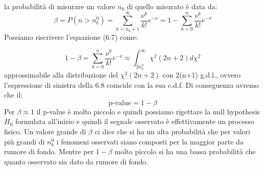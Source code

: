 \noindent la probabilit\`{a} di misurare un valore $n_b$ di quello misurato \`{e} data da:
\begin{equation}
	\beta = P(n > n_b^{0}) = \sum_{k =n_0+1}^{\infty}\dfrac{\nu^k}{k!}e^{-\nu} = 1- \sum_{k =0}^{n}\dfrac{\nu^k}{k!}e^{-\nu}  	
\end{equation}
Possiamo riscrivere l'equazione (6.7) come:

\begin{equation}
	1-\beta = \sum_{k =0}^{n}\dfrac{\nu^k}{k!}e^{-\nu} \approx \int_{2n_{b}^0}^{\infty}\chi^2(2n+2)d\chi^2
\end{equation} 
\newline
approssimabile alla distribuzione del $\chi^2(2n+2)$ con 2(n+1) g.d.l., ovvero l'espressione di sinistra della 6.8 coincide con la sua c.d.f. Di conseguenza avremo che il:
\begin{equation*}
	\text{p-value} = 1- \beta
\end{equation*}
Per $\beta \approx 1$ il p-value \`{e} molto piccolo e quindi possiamo rigettare la null hypothesis $H_0$ formulata all'inizio e quindi il segnale osservato \`{e} effettivamente un processo fisico. Un valore grande di $\beta$ ci dice che si ha un alta probabilit\`{a} che per valori pi\`{u} grandi di $n_b^0$ i fenomeni osservati siano composti per la maggior parte da rumore di fondo. Mentre per $1-\beta$ molto piccolo si ha una bassa probabilit\`{a} che quanto osservato sia dato da rumore di fondo.

